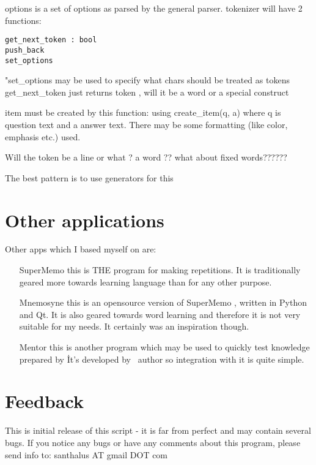 \documentclass[a4paper,11pt]{article}
\newcommand{\probe}{\emph{\sc{probe{}}}}
\begin{document}
options is a set of options as parsed by the general parser.
tokenizer will have 2 functions:
\begin{verbatim}
get_next_token : bool
push_back
set_options
\end{verbatim}

"set\_options may be used to specify what chars should be treated as tokens
get\_next\_token just returns token , will it be a word or a special construct

item must be created by this function: using create\_item(q, a) where q is
question text and a answer text. There may be some formatting (like color,
emphasis etc.) used.


Will the token be a line or what ?  a word ??
what about fixed words??????


The best pattern is to use generators for this




\section{Other applications}

Other apps which I based myself on are:
\begin{enumerate}

\item[SuperMemo] this is THE program for making repetitions. It is
  traditionally geared more towards learning language than for any other
  purpose.

\item[Mnemosyne]this is an opensource version of SuperMemo , written in
Python and Qt. It is also geared towards word learning and therefore it
is not very suitable for my needs. It certainly was an inspiration
though.

\item[Mentor] this is another program which may be used to quickly test knowledge prepared by \probe\.
It's developed by \probe\ author so integration with it is quite simple.

\end{enumerate}

\section{Feedback}
This is initial release of this script - it is far from perfect and may
contain several bugs.
If you notice any bugs or have any comments about this program, please
send info to: santhalus AT gmail DOT com


%
\end{document}
